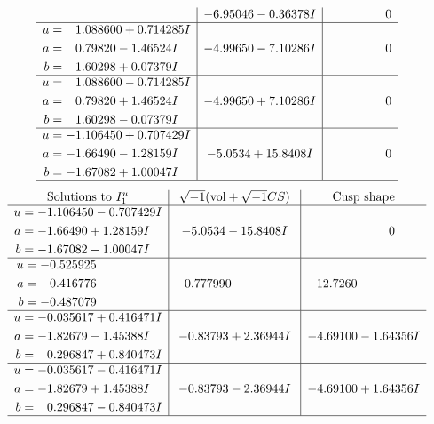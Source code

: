 \documentclass[1p]{elsarticle_modified}
\theoremstyle{definition}
\newcommand{\I}{\sqrt{-1}}
\begin{document}
$$\begin{array}{c|c|c}
 & -6.95046 - 0.36378 I & \phantom{-0.000000 } 0 \\ \hline\begin{aligned}
u &= \phantom{-}1.088600 + 0.714285 I \\
a &= \phantom{-}0.79820 - 1.46524 I \\
b &= \phantom{-}1.60298 + 0.07379 I\end{aligned}
 & -4.99650 - 7.10286 I & \phantom{-0.000000 } 0 \\ \hline\begin{aligned}
u &= \phantom{-}1.088600 - 0.714285 I \\
a &= \phantom{-}0.79820 + 1.46524 I \\
b &= \phantom{-}1.60298 - 0.07379 I\end{aligned}
 & -4.99650 + 7.10286 I & \phantom{-0.000000 } 0 \\ \hline\begin{aligned}
u &= -1.106450 + 0.707429 I \\
a &= -1.66490 - 1.28159 I \\
b &= -1.67082 + 1.00047 I\end{aligned}
 & -5.0534 + 15.8408 I & \phantom{-0.000000 } 0\\
 \hline 
 \end{array}$$\newpage$$\begin{array}{c|c|c}  
\text{Solutions to }I^u_{1}& \I (\text{vol} + \sqrt{-1}CS) & \text{Cusp shape}\\
 \hline 
\begin{aligned}
u &= -1.106450 - 0.707429 I \\
a &= -1.66490 + 1.28159 I \\
b &= -1.67082 - 1.00047 I\end{aligned}
 & -5.0534 - 15.8408 I & \phantom{-0.000000 } 0 \\ \hline\begin{aligned}
u &= -0.525925\phantom{ +0.000000I} \\
a &= -0.416776\phantom{ +0.000000I} \\
b &= -0.487079\phantom{ +0.000000I}\end{aligned}
 & -0.777990\phantom{ +0.000000I} & -12.7260\phantom{ +0.000000I} \\ \hline\begin{aligned}
u &= -0.035617 + 0.416471 I \\
a &= -1.82679 - 1.45388 I \\
b &= \phantom{-}0.296847 + 0.840473 I\end{aligned}
 & -0.83793 + 2.36944 I & -4.69100 - 1.64356 I \\ \hline\begin{aligned}
u &= -0.035617 - 0.416471 I \\
a &= -1.82679 + 1.45388 I \\
b &= \phantom{-}0.296847 - 0.840473 I\end{aligned}
 & -0.83793 - 2.36944 I & -4.69100 + 1.64356 I\\
 \hline 
 \end{array}$$\newpage\newpage\renewcommand{\arraystretch}{1}
\end{document}
